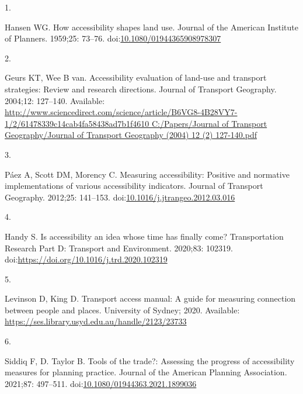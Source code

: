 \documentclass[10pt,letterpaper]{article}
\newlength{\cslhangindent}
\newlength{\csllabelwidth}
\newlength{\cslentryspacingunit} %
\newenvironment{CSLReferences}[2] %
 {%
  \setlength{\parindent}{0pt}
  \ifodd #1
  \let\oldpar\par
  \def\par{\hangindent=\cslhangindent\oldpar}
  \fi
  \setlength{\parskip}{#2\cslentryspacingunit}
 }%
 {}
\newcommand{\CSLLeftMargin}[1]{\parbox[t]{\csllabelwidth}{#1}}
\newcommand{\CSLRightInline}[1]{\parbox[t]{\linewidth - \csllabelwidth}{#1}\break}
\begin{document}
\hypertarget{refs}{}
\begin{CSLReferences}{0}{0}
\leavevmode{}%
\CSLLeftMargin{1. }%
\CSLRightInline{Hansen WG. How accessibility shapes land use. Journal of
the American Institute of Planners. 1959;25: 73--76.
doi:\href{https://doi.org/10.1080/01944365908978307}{10.1080/01944365908978307}}

\leavevmode{}%
\CSLLeftMargin{2. }%
\CSLRightInline{Geurs KT, Wee B van. Accessibility evaluation of
land-use and transport strategies: Review and research directions.
Journal of Transport Geography. 2004;12: 127--140. Available:
\href{http://www.sciencedirect.com/science/article/B6VG8-4B28VY7-1/2/61478339c14cab4fa58438ad7b1f4610\%0AC:/Papers/Journal\%20of\%20Transport\%20Geography/Journal\%20of\%20Transport\%20Geography\%20(2004)\%2012\%20(2)\%20127-140.pdf}{http://www.sciencedirect.com/science/article/B6VG8-4B28VY7-1/2/61478339c14cab4fa58438ad7b1f4610
C:/Papers/Journal of Transport Geography/Journal of Transport Geography
(2004) 12 (2) 127-140.pdf}}

\leavevmode{}%
\CSLLeftMargin{3. }%
\CSLRightInline{Páez A, Scott DM, Morency C. Measuring accessibility:
Positive and normative implementations of various accessibility
indicators. Journal of Transport Geography. 2012;25: 141--153.
doi:\href{https://doi.org/10.1016/j.jtrangeo.2012.03.016}{10.1016/j.jtrangeo.2012.03.016}}

\leavevmode{}%
\CSLLeftMargin{4. }%
\CSLRightInline{Handy S. Is accessibility an idea whose time has finally
come? Transportation Research Part D: Transport and Environment.
2020;83: 102319. doi:\url{https://doi.org/10.1016/j.trd.2020.102319}}

\leavevmode{}%
\CSLLeftMargin{5. }%
\CSLRightInline{Levinson D, King D. Transport access manual: {A} guide
for measuring connection between people and places. {University of
Sydney}; 2020. Available:
\url{https://ses.library.usyd.edu.au/handle/2123/23733}}

\leavevmode{}%
\CSLLeftMargin{6. }%
\CSLRightInline{Siddiq F, D. Taylor B. Tools of the trade?: Assessing
the progress of accessibility measures for planning practice. Journal of
the American Planning Association. 2021;87: 497--511.
doi:\href{https://doi.org/10.1080/01944363.2021.1899036}{10.1080/01944363.2021.1899036}}


\end{CSLReferences}
\end{document}
